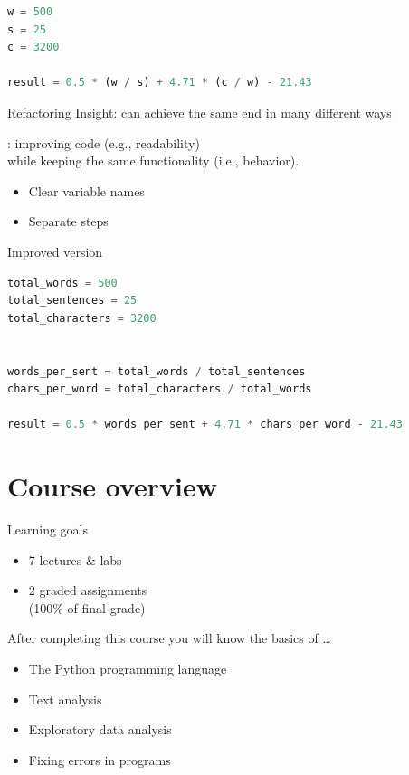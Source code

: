 \documentclass[aspectratio=169,usenames,dvipsnames]{beamer}
\begin{document}
\begin{frame}[fragile]
\begin{lstlisting}[language=python]
w = 500
s = 25
c = 3200

result = 0.5 * (w / s) + 4.71 * (c / w) - 21.43
\end{lstlisting}
\end{frame}

\begin{frame}{Refactoring}
	Insight: can achieve the same end in many different ways

	\pause
	\begin{definition}
		: improving code (e.g., readability) \\
			while keeping the same functionality (i.e., behavior).
	\end{definition}

	\begin{itemize}
		\item Clear variable names
		\item Separate steps
	\end{itemize}
\end{frame}


\begin{frame}[fragile]{Improved version}
\begin{lstlisting}[language=python]
total_words = 500
total_sentences = 25
total_characters = 3200


words_per_sent = total_words / total_sentences
chars_per_word = total_characters / total_words

result = 0.5 * words_per_sent + 4.71 * chars_per_word - 21.43
\end{lstlisting}
\end{frame}



\section{Course overview}
\frame{\tableofcontents[currentsection]}

\begin{frame}{Learning goals}
    \begin{itemize}
       \item 7 lectures \& labs
       \item 2 graded assignments \\
           (100\% of final grade)
    \end{itemize}
    After completing this course you will know the basics of \dots
    \begin{itemize}
       \item The Python programming language
       \item Text analysis
       \item Exploratory data analysis
       \item Fixing errors in programs
    \end{itemize}
\end{frame}
\end{document}
